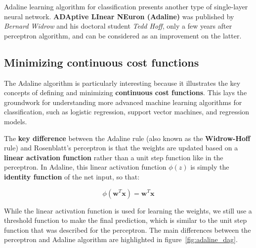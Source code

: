 \documentclass[11pt]{article}
\newcommand{\vect}[1]{\boldsymbol{#1}}
\begin{document}
    Adaline learning algorithm for classification presents another type of single-layer neural network.
    \textbf{ADAptive LInear NEuron (Adaline)} was published by \textit{Bernard Widrow} and his doctoral student \textit{Tedd Hoff}\cite{Widrow1960}, only a few years after  perceptron algorithm\cite{Rosenblatt1957a}, and can be considered as an improvement on the latter.

    \subsection{Minimizing continuous cost functions} \label{subsec:min_con_cost}

    The Adaline algorithm is particularly interesting because it illustrates the key concepts of defining and minimizing \textbf{continuous cost functions}.
    This lays the groundwork for understanding more advanced machine learning algorithms for classification, such as logistic regression, support vector machines, and regression models.

    The \textbf{key difference} between the Adaline rule (also known as the \textbf{Widrow-Hoff} rule) and Rosenblatt's perceptron is that the weights are updated based on a \textbf{linear activation function} rather than a unit step function like in the perceptron.
    In Adaline, this linear activation function $\phi(z)$ is simply the \textbf{identity function} of the net input, so that:

    \begin{equation}
        \label{eq:ada_func_act}
        \phi ( \vect{w}^T \vect{x} ) = \vect{w}^T \vect{x}
    \end{equation}

    While the linear activation function is used for learning the weights, we still use a threshold function to make the final prediction, which is similar to the unit step function that was described for the perceptron.
    The main differences between the perceptron and Adaline algorithm are highlighted in figure~\ref{fig:adaline_dag}.
\end{document}
